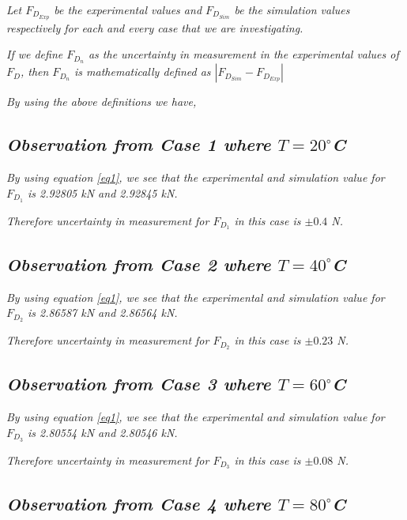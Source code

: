 \textit{Let $F_{{D}_{Exp}}$ be the experimental values and $F_{{D}_{Sim}}$ be the simulation values respectively for each and every case that we are investigating.} 

\textit{If we define $F_{D_n}$ as the uncertainty in measurement in the experimental values of $F_D$, then $F_{D_n}$ is mathematically defined as $\left| F_{{D}_{Sim}} - F_{{D}_{Exp}} \right|$}

\textit{By using the above definitions we have,}

\subsection{\textit{Observation from Case 1 where $T = 20^\circ$C}}

	\textit{By using equation \ref{eq1}, we see that the experimental and simulation value for $F_{D_1}$ is 2.92805 kN and 2.92845 kN.}
        
	\textit{Therefore uncertainty in measurement for $F_{D_1}$ in this case is $\pm{\textit{0.4}}$ N.}        
        
\subsection{\textit{Observation from Case 2 where $T = 40^\circ$C}}
        
	\textit{By using equation \ref{eq1}, we see that the experimental and simulation value for $F_{D_2}$ is 2.86587 kN and 2.86564 kN.}
        
	\textit{Therefore uncertainty in measurement for $F_{D_2}$ in this case is $\pm{\textit{0.23}}$ N.}       
        
\subsection{\textit{Observation from Case 3 where $T = 60^\circ$C}}
        
	\textit{By using equation \ref{eq1}, we see that the experimental and simulation value for $F_{D_3}$ is 2.80554 kN and 2.80546 kN.}
        
	\textit{Therefore uncertainty in measurement for $F_{D_3}$ in this case is $\pm{\textit{0.08}}$ N.}
        
\subsection{\textit{Observation from Case 4 where $T = 80^\circ$C}}
        
